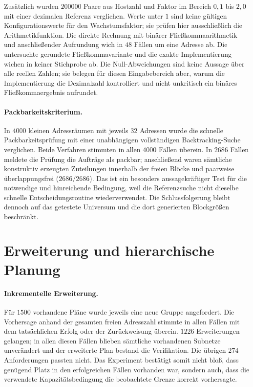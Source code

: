\documentclass[a4paper,12pt, twoside]{report}
\theoremstyle{definition}
\begin{document}
Zusätzlich wurden $200000$ Paare aus Hostzahl und Faktor im Bereich $0{,}1$ bis $2{,}0$ mit einer dezimalen Referenz verglichen. Werte unter $1$ sind keine gültigen Konfigurationswerte für den Wachstumsfaktor; sie prüfen hier ausschließlich die Arithmetikfunktion. Die direkte Rechnung mit binärer Fließkommaarithmetik und anschließender Aufrundung wich in $48$ Fällen um eine Adresse ab. Die untersuchte gerundete Fließkommavariante und die exakte Implementierung wichen in keiner Stichprobe ab. Die Null-Abweichungen sind keine Aussage über alle reellen Zahlen; sie belegen für diesen Eingabebereich aber, warum die Implementierung die Dezimalzahl kontrolliert und nicht unkritisch ein binäres Fließkommaergebnis aufrundet.

\paragraph{Packbarkeitskriterium.}
In $4000$ kleinen Adressräumen mit jeweils $32$ Adressen wurde die schnelle Packbarkeitsprüfung mit einer unabhängigen vollständigen Backtracking-Suche verglichen. Beide Verfahren stimmten in allen $4000$ Fällen überein. In $2686$ Fällen meldete die Prüfung die Aufträge als packbar; anschließend waren sämtliche konstruktiv erzeugten Zuteilungen innerhalb der freien Blöcke und paarweise überlappungsfrei ($2686/2686$). Das ist ein besonders aussagekräftiger Test für die notwendige und hinreichende Bedingung, weil die Referenzsuche nicht dieselbe schnelle Entscheidungsroutine wiederverwendet. Die Schlussfolgerung bleibt dennoch auf das getestete Universum und die dort generierten Blockgrößen beschränkt.

\section{Erweiterung und hierarchische Planung}

\paragraph{Inkrementelle Erweiterung.}
Für $1500$ vorhandene Pläne wurde jeweils eine neue Gruppe angefordert. Die Vorhersage anhand der gesamten freien Adresszahl stimmte in allen Fällen mit dem tatsächlichen Erfolg oder der Zurückweisung überein. $1226$ Erweiterungen gelangen; in allen diesen Fällen blieben sämtliche vorhandenen Subnetze unverändert und der erweiterte Plan bestand die Verifikation. Die übrigen $274$ Anforderungen passten nicht. Das Experiment bestätigt somit nicht bloß, dass genügend Platz in den erfolgreichen Fällen vorhanden war, sondern auch, dass die verwendete Kapazitätsbedingung die beobachtete Grenze korrekt vorhersagte.
\end{document}
